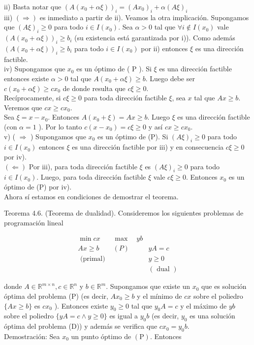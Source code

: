 \documentclass[10pt]{article}
\begin{document}
ii) Basta notar que $\left(A\left(x_{0}+\alpha \xi\right)\right)_{i}=\left(A x_{0}\right)_{i}+\alpha(A \xi)_{i}$\\
iii) $(\Longrightarrow)$ es inmediato a partir de ii). Veamos la otra implicación. Supongamos que $(A \xi)_{i} \geq 0$ para todo $i \in I\left(x_{0}\right)$. Sea $\alpha>0$ tal que $\forall i \notin I\left(x_{0}\right)$ vale $\left(A\left(x_{0}+\alpha \xi\right)\right)_{i} \geq b_{i}$ (su existencia está garantizada por i)). Como además $\left(A\left(x_{0}+\alpha \xi\right)\right)_{i} \geq b_{i}$ para todo $i \in I\left(x_{0}\right)$ por ii) entonces $\xi$ es una dirección factible.\\
iv) Supongamos que $x_{0}$ es un óptimo de ( P ). Si $\xi$ es una dirección factible entonces existe $\alpha>0$ tal que $A\left(x_{0}+\alpha \xi\right) \geq b$. Luego debe ser $c\left(x_{0}+\alpha \xi\right) \geq c x_{0}$ de donde resulta que $c \xi \geq 0$.\\
Recíprocamente, si $c \xi \geq 0$ para toda dirección factible $\xi$, sea $x$ tal que $A x \geq b$. Veremos que $c x \geq c x_{0}$.\\
Sea $\xi=x-x_{0}$. Entonces $A\left(x_{0}+\xi\right)=A x \geq b$. Luego $\xi$ es una dirección factible (con $\alpha=1$ ). Por lo tanto $c\left(x-x_{0}\right)=c \xi \geq 0$ y así $c x \geq c x_{0}$.\\
v) ( $\Longrightarrow$ ) Supongamos que $x_{0}$ es un óptimo de (P). Si $(A \xi)_{i} \geq 0$ para todo $i \in I\left(x_{0}\right)$ entonces $\xi$ es una dirección factible por iii) y en consecuencia $c \xi \geq 0$ por iv).\\
$(\Longleftarrow)$ Por iii), para toda dirección factible $\xi$ es $(A \xi)_{i} \geq 0$ para todo $i \in I\left(x_{0}\right)$. Luego, para toda dirección factible $\xi$ vale $c \xi \geq 0$. Entonces $x_{0}$ es un óptimo de (P) por iv).\\
Ahora sí estamos en condiciones de demostrar el teorema.

Teorema 4.6. (Teorema de dualidad). Consideremos los siguientes problemas de programación lineal

\[
\begin{array}{ccc}
\min c x & \max \quad y b \\
A x \geq b & (P) & y A=c  \tag{D}\\
\text { (primal) } & & y \geq 0 \\
& & (\text { dual })
\end{array}
\]

donde $A \in \mathbb{R}^{m \times n}, c \in \mathbb{R}^{n}$ y $b \in \mathbb{R}^{m}$. Supongamos que existe un $x_{0}$ que es solución óptima del problema (P) (es decir, $A x_{0} \geq b$ y el mínimo de $c x$ sobre el poliedro $\{A x \geq b\}$ es $c x_{0}$ ). Entonces existe $y_{0} \geq 0$ tal que $y_{0} A=c$ y el máximo de $y b$ sobre el poliedro $\{y A=c \wedge y \geq 0\}$ es igual a $y_{0} b$ (es decir, $y_{0}$ es una solución óptima del problema (D)) y además se verifica que $c x_{0}=y_{0} b$.\\
Demostración: Sea $x_{0}$ un punto óptimo de $(\mathrm{P})$. Entonces
\end{document}
